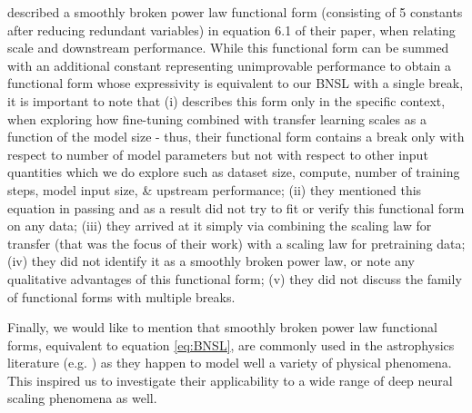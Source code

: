 \documentclass{article} %
\begin{document}
\citet{2021arXiv210201293H} described a smoothly broken power law functional form (consisting of 5 constants after reducing redundant variables) in equation 6.1 of their paper, when relating scale and downstream performance. 
While this functional form can be summed with an additional constant representing unimprovable performance to obtain a functional form whose expressivity is equivalent to our BNSL with a single break, it is important to note that (i) \citet{2021arXiv210201293H} describes this form only in the specific context, when exploring how  fine-tuning combined with transfer learning scales as a function of the model size - thus, their functional form contains a break only with respect to number of model parameters but not with respect to other input quantities which we do explore such as dataset size, compute, number of training steps, model input size, \& upstream performance; (ii) they mentioned this equation in passing and as a result did not try to fit or verify this functional form on any data; (iii) they arrived at it simply via combining the scaling law for transfer (that was the focus of their work) with a scaling law for pretraining data; (iv) they did not identify it as a smoothly broken power law, or note any qualitative advantages of this functional form; (v) they did not discuss the family of functional forms with multiple breaks. 

\vspace{-0.65mm}

Finally, we would like to mention that smoothly broken power law functional forms, equivalent to equation \ref{eq:BNSL}, are commonly used in the astrophysics literature (e.g. \cite{dampe2017direct}) as they happen  to  model well a variety of physical phenomena. This inspired us to investigate their applicability to a wide range of deep neural scaling phenomena as well.

\clearpage





%
\end{document}
